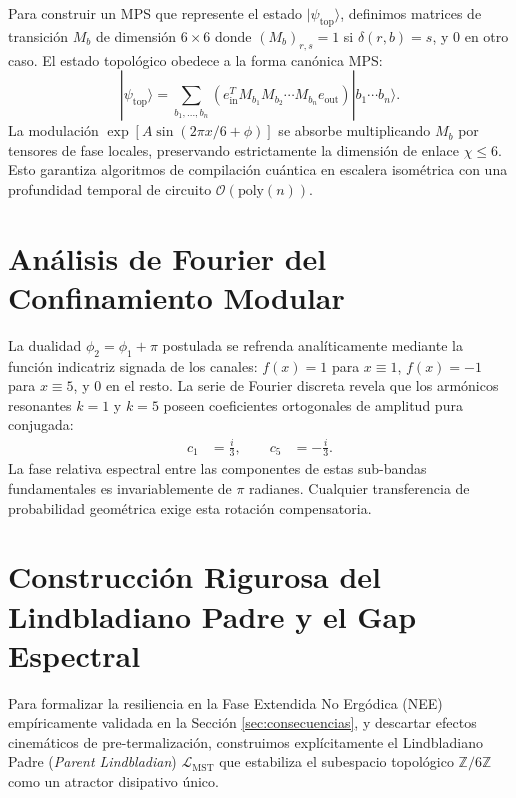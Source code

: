 \documentclass[12pt,a4paper]{article}
\theoremstyle{plain}
\theoremstyle{definition}
\theoremstyle{remark}
\begin{document}
Para construir un MPS que represente el estado $|\psi_{\text{top}}\rangle$, definimos matrices de transición $M_b$ de dimensión $6\times 6$ donde $(M_b)_{r,s} = 1$ si $\delta(r,b) = s$, y $0$ en otro caso. El estado topológico obedece a la forma canónica MPS:
\begin{equation}
|\psi_{\text{top}}\rangle = \sum_{b_1,\dots,b_n} \left( e_{\text{in}}^T M_{b_1} M_{b_2} \cdots M_{b_n} e_{\text{out}} \right) |b_1\cdots b_n\rangle.
\end{equation}
La modulación $\exp[A\sin(2\pi x/6 + \phi)]$ se absorbe multiplicando $M_b$ por tensores de fase locales, preservando estrictamente la dimensión de enlace $\chi \le 6$. Esto garantiza algoritmos de compilación cuántica en escalera isométrica con una profundidad temporal de circuito $\mathcal{O}(\text{poly}(n))$.

\section{Análisis de Fourier del Confinamiento Modular}
\label{app:fourier}

La dualidad $\phi_2 = \phi_1 + \pi$ postulada se refrenda analíticamente mediante la función indicatriz signada de los canales: $f(x) = 1$ para $x \equiv 1$, $f(x) = -1$ para $x \equiv 5$, y $0$ en el resto. La serie de Fourier discreta revela que los armónicos resonantes $k=1$ y $k=5$ poseen coeficientes ortogonales de amplitud pura conjugada:
\begin{align}
c_1 &= \frac{i}{3}, \qquad c_5 &= -\frac{i}{3}.
\end{align}
La fase relativa espectral entre las componentes de estas sub-bandas fundamentales es invariablemente de $\pi$ radianes. Cualquier transferencia de probabilidad geométrica exige esta rotación compensatoria.

\section{Construcción Rigurosa del Lindbladiano Padre y el Gap Espectral}
\label{app:lindblad_construction}

Para formalizar la resiliencia en la Fase Extendida No Ergódica (NEE) empíricamente validada en la Sección \ref{sec:consecuencias}, y descartar efectos cinemáticos de pre-termalización, construimos explícitamente el Lindbladiano Padre (\textit{Parent Lindbladian}) $\mathcal{L}_{\text{MST}}$ que estabiliza el subespacio topológico $\mathbb{Z}/6\mathbb{Z}$ como un atractor disipativo único.
\end{document}
